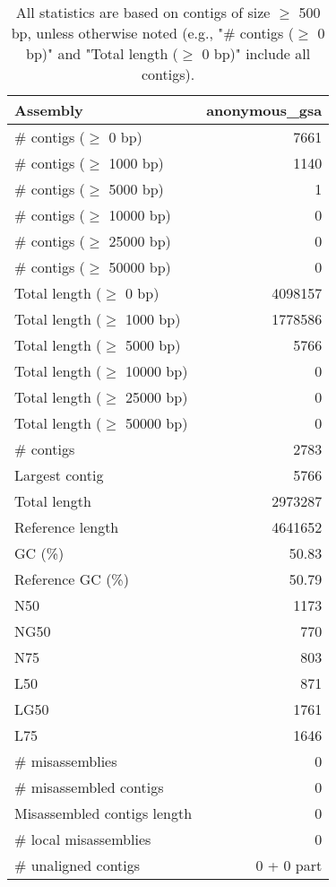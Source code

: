 \documentclass[12pt,a4paper]{article}
\begin{document}
\begin{table}[ht]
\begin{center}
\caption{All statistics are based on contigs of size $\geq$ 500 bp, unless otherwise noted (e.g., "\# contigs ($\geq$ 0 bp)" and "Total length ($\geq$ 0 bp)" include all contigs).}
\begin{tabular}{|l*{1}{|r}|}
\hline
Assembly & anonymous\_gsa \\ \hline
\# contigs ($\geq$ 0 bp) & 7661 \\ \hline
\# contigs ($\geq$ 1000 bp) & 1140 \\ \hline
\# contigs ($\geq$ 5000 bp) & 1 \\ \hline
\# contigs ($\geq$ 10000 bp) & 0 \\ \hline
\# contigs ($\geq$ 25000 bp) & 0 \\ \hline
\# contigs ($\geq$ 50000 bp) & 0 \\ \hline
Total length ($\geq$ 0 bp) & 4098157 \\ \hline
Total length ($\geq$ 1000 bp) & 1778586 \\ \hline
Total length ($\geq$ 5000 bp) & 5766 \\ \hline
Total length ($\geq$ 10000 bp) & 0 \\ \hline
Total length ($\geq$ 25000 bp) & 0 \\ \hline
Total length ($\geq$ 50000 bp) & 0 \\ \hline
\# contigs & 2783 \\ \hline
Largest contig & 5766 \\ \hline
Total length & 2973287 \\ \hline
Reference length & 4641652 \\ \hline
GC (\%) & 50.83 \\ \hline
Reference GC (\%) & 50.79 \\ \hline
N50 & 1173 \\ \hline
NG50 & 770 \\ \hline
N75 & 803 \\ \hline
L50 & 871 \\ \hline
LG50 & 1761 \\ \hline
L75 & 1646 \\ \hline
\# misassemblies & 0 \\ \hline
\# misassembled contigs & 0 \\ \hline
Misassembled contigs length & 0 \\ \hline
\# local misassemblies & 0 \\ \hline
\# unaligned contigs & 0 + 0 part \\ \hline

\end{tabular}
\end{center}
\end{table}
\end{document}
